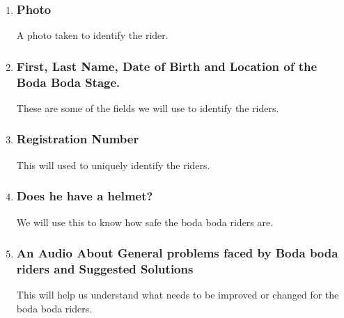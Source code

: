 \documentclass{article}               %
\begin{document}
\begin{enumerate}
\item{\subsubsection*{Photo}}
A photo taken to identify the rider.
\item{\subsubsection*{First, Last Name, Date of Birth and Location of the Boda Boda Stage.}}
These are some of the fields we will use to identify the riders.
\item{\subsubsection*{Registration Number}}
This will used to uniquely identify the riders.
\item{\subsubsection*{Does he have a helmet?}}
We will use this to know how safe the boda boda riders are.
\item{\subsubsection*{An Audio About General problems faced by Boda boda riders and Suggested Solutions}}
This will help us understand what needs to be improved or changed for the boda boda riders.
\end{enumerate}
\end{document}
